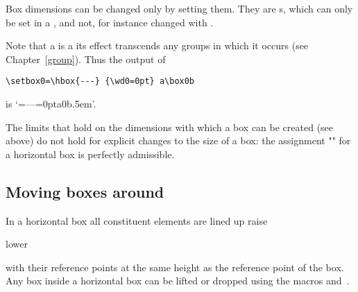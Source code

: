 \documentclass{book}
\begin{document}
Box dimensions can be changed only by setting them.
They are s, which can only be set
in a , and not, for instance
changed with .

Note that a  is a
 its effect transcends
  any groups in which it occurs (see Chapter~\ref{group}).  Thus the
  output of
\begin{verbatim}
\setbox0=\hbox{---} {\wd0=0pt} a\box0b
\end{verbatim}
is `{=\hbox{---}{=0pt}a\box0b}\kern.5em'.

The limits that hold on the dimensions with which a
box can be created (see above) do not hold for explicit changes to the
\mdqon
size of a box: the assignment ""\n{-2pt} for a
\mdqoff
horizontal box is perfectly admissible.

\subsection{Moving boxes around}

In a horizontal box all constituent elements are lined up
\cstoidx raise\par\cstoidx lower\par
with their reference points at the same height as the
reference point of the box. Any box inside a horizontal
box can be lifted or dropped using the macros
 and~.
\end{document}
